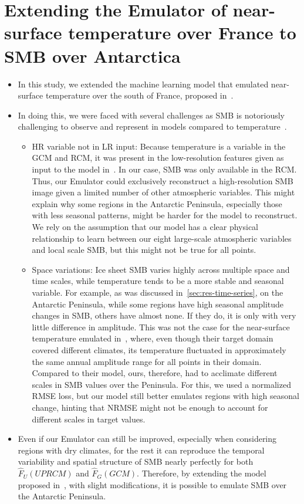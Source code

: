 \documentclass[a4paper,11pt,oneside]{report}
\begin{document}
\section{Extending the Emulator of near-surface temperature over France to SMB over Antarctica}\label{sec:extension-doury}
\begin{itemize}
    \item In this study, we extended the machine learning model that emulated near-surface temperature over the south of France, proposed in~\cite{Doury}. 
    \item In doing this, we were faced with several challenges as SMB is notoriously challenging to observe and represent in models compared to temperature~\cite{Lenaerts}. 
    \begin{itemize}
        \item HR variable not in LR input: Because temperature is a variable in the GCM and RCM, it was present in the low-resolution features given as input to the model in~\cite{Doury}. In our case, SMB was only available in the RCM. Thus, our Emulator could exclusively reconstruct a high-resolution SMB image given a limited number of other atmospheric variables. This might explain why some regions in the Antarctic Peninsula, especially those with less seasonal patterns, might be harder for the model to reconstruct. We rely on the assumption that our model has a clear physical relationship to learn between our eight large-scale atmospheric variables and local scale SMB, but this might not be true for all points. 
        \item Space variations: Ice sheet SMB varies highly across multiple space and time scales, while temperature tends to be a more stable and seasonal variable. For example, as was discussed in~\ref{sec:res-time-series}, on the Antarctic Peninsula, while some regions have high seasonal amplitude changes in SMB, others have almost none. If they do, it is only with very little difference in amplitude. This was not the case for the near-surface temperature emulated in~\cite{Doury}, where, even though their target domain covered different climates, its temperature fluctuated in approximately the same annual amplitude range for all points in their domain. Compared to their model, ours, therefore, had to acclimate different scales in SMB values over the Peninsula. For this, we used a normalized RMSE loss, but our model still better emulates regions with high seasonal change, hinting that NRMSE might not be enough to account for different scales in target values. 
    \end{itemize}
    \item Even if our Emulator can still be improved, especially when considering regions with dry climates, for the rest it can reproduce the temporal variability and spatial structure of SMB nearly perfectly for both $\hat{F}_{U}(UPRCM)$ and $\hat{F}_{G}(GCM)$. Therefore, by extending the model proposed in~\cite{Doury}, with slight modifications, it is possible to emulate SMB over the Antarctic Peninsula. 
\end{itemize}
\end{document}
